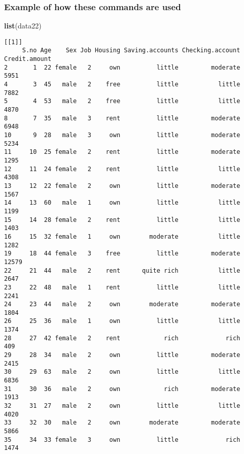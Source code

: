 \documentclass[
]{article}
\newenvironment{Shaded}{\begin{snugshade}}{\end{snugshade}}
\newcommand{\FunctionTok}[1]{\textcolor[rgb]{0.13,0.29,0.53}{\textbf{#1}}}
\newcommand{\NormalTok}[1]{#1}
\begin{document}
\hypertarget{example-of-how-these-commands-are-used}{%
\subsubsection{Example of how these commands are
used}\label{example-of-how-these-commands-are-used}}

\begin{Shaded}
\begin{Highlighting}[]
\FunctionTok{list}\NormalTok{(data22)}
\end{Highlighting}
\end{Shaded}

\begin{verbatim}
[[1]]
     S.no Age    Sex Job Housing Saving.accounts Checking.account Credit.amount
2       1  22 female   2     own          little         moderate          5951
4       3  45   male   2    free          little           little          7882
5       4  53   male   2    free          little           little          4870
8       7  35   male   3    rent          little         moderate          6948
10      9  28   male   3     own          little         moderate          5234
11     10  25 female   2    rent          little         moderate          1295
12     11  24 female   2    rent          little           little          4308
13     12  22 female   2     own          little         moderate          1567
14     13  60   male   1     own          little           little          1199
15     14  28 female   2    rent          little           little          1403
16     15  32 female   1     own        moderate           little          1282
19     18  44 female   3    free          little         moderate         12579
22     21  44   male   2    rent      quite rich           little          2647
23     22  48   male   1    rent          little           little          2241
24     23  44   male   2     own        moderate         moderate          1804
26     25  36   male   1     own          little           little          1374
28     27  42 female   2    rent            rich             rich           409
29     28  34   male   2     own          little         moderate          2415
30     29  63   male   2     own          little           little          6836
31     30  36   male   2     own            rich         moderate          1913
32     31  27   male   2     own          little           little          4020
33     32  30   male   2     own        moderate         moderate          5866
35     34  33 female   3     own          little             rich          1474

\end{verbatim}
\end{document}
